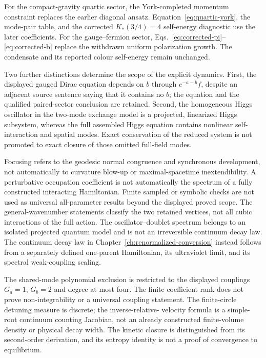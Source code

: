 \documentclass[11pt,a4paper,oneside]{book}
\theoremstyle{plain}
\theoremstyle{definition}
\theoremstyle{remark}
\begin{document}
For the compact-gravity quartic sector, the York-completed momentum constraint replaces the earlier diagonal ansatz. Equation~\eqref{eq:quartic-york}, the mode-pair table, and the corrected $K_*(3/4)=4$ self-energy diagnostic use the later coefficients. For the gauge--fermion sector, Eqs.~\eqref{eq:corrected-pi}--\eqref{eq:corrected-b} replace the withdrawn uniform polarization growth. The condensate and its reported colour self-energy remain unchanged.

Two further distinctions determine the scope of the explicit dynamics. First, the displayed gauged Dirac equation depends on $b$ through $e^{-a-b}f$, despite an adjacent source sentence saying that it contains no $b$; the equation and the qualified paired-sector conclusion are retained. Second, the homogeneous Higgs oscillator in the two-mode exchange model is a projected, linearized Higgs subsystem, whereas the full assembled Higgs equation contains nonlinear self-interaction and spatial modes. Exact conservation of the reduced system is not promoted to exact closure of those omitted full-field modes.

Focusing refers to the geodesic normal congruence and synchronous development, not automatically to curvature blow-up or maximal-spacetime inextendibility. A perturbative occupation coefficient is not automatically the spectrum of a fully constructed interacting Hamiltonian. Finite sampled or symbolic checks are not used as universal all-parameter results beyond the displayed proved scope. The general-wavenumber statements classify the two retained vertices, not all cubic interactions of the full action. The oscillator--doublet spectrum belongs to an isolated projected quantum model and is not an irreversible continuum decay law.  The continuum decay law in Chapter~\ref{ch:renormalized-conversion} instead follows from a separately defined one-parent Hamiltonian, its ultraviolet limit, and its spectral weak-coupling scaling.

The shared-mode polynomial exclusion is restricted to the displayed
couplings $G_a=1$, $G_b=2$ and degree at most four.  The finite coefficient
rank does not prove non-integrability or a universal coupling statement.
The finite-circle detuning measure is discrete; the inverse-relative-
velocity formula is a simple-root continuum counting Jacobian, not an
already constructed finite-volume density or physical decay width.
The kinetic closure is distinguished from its second-order derivation,
and its entropy identity is not a proof of convergence to equilibrium.
\end{document}
